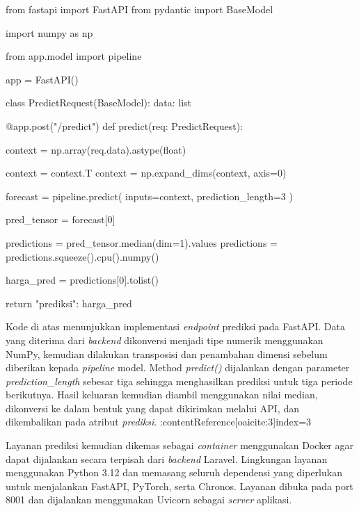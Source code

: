 \begin{code}
\begin{ignasicblock}
from fastapi import FastAPI
from pydantic import BaseModel

import numpy as np

from app.model import pipeline

app = FastAPI()

class PredictRequest(BaseModel):
    data: list

@app.post("/predict")
def predict(req: PredictRequest):

    context = np.array(req.data).astype(float)

    context = context.T
    context = np.expand_dims(context, axis=0)

    forecast = pipeline.predict(
        inputs=context,
        prediction_length=3
    )

    pred_tensor = forecast[0]

    predictions = pred_tensor.median(dim=1).values
    predictions = predictions.squeeze().cpu().numpy()

    harga_pred = predictions[0].tolist()

    return {
        "prediksi": harga_pred
    }
\end{ignasicblock}
\end{code}

Kode di atas menunjukkan implementasi \textit{endpoint} prediksi pada FastAPI. Data yang diterima dari \textit{backend} dikonversi menjadi tipe numerik menggunakan NumPy, kemudian dilakukan transposisi dan penambahan dimensi sebelum diberikan kepada \textit{pipeline} model. Method \textit{predict()} dijalankan dengan parameter \textit{prediction\_length} sebesar tiga sehingga menghasilkan prediksi untuk tiga periode berikutnya. Hasil keluaran kemudian diambil menggunakan nilai median, dikonversi ke dalam bentuk yang dapat dikirimkan melalui API, dan dikembalikan pada atribut \textit{prediksi}. :contentReference[oaicite:3]{index=3}

Layanan prediksi kemudian dikemas sebagai \textit{container} menggunakan Docker agar dapat dijalankan secara terpisah dari \textit{backend} Laravel. Lingkungan layanan menggunakan Python 3.12 dan memasang seluruh dependensi yang diperlukan untuk menjalankan FastAPI, PyTorch, serta Chronos. Layanan dibuka pada port 8001 dan dijalankan menggunakan Uvicorn sebagai \textit{server} aplikasi.

